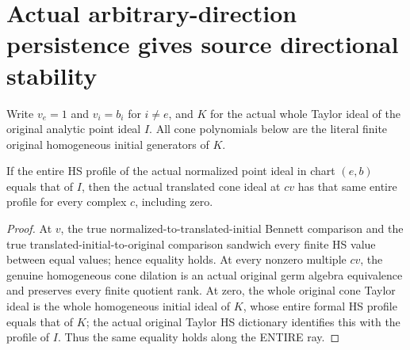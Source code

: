 \section{Actual arbitrary-direction persistence gives source directional stability}

Write $v_e=1$ and $v_i=b_i$ for $i\ne e$, and $K$ for the actual whole
Taylor ideal of the original analytic point ideal $I$. All cone polynomials
below are the literal finite original homogeneous initial generators of $K$.

\begin{theorem}
\label{hir:actual-directional-persistent-cone-ray-hs}
\leanok
If the entire HS profile of the actual normalized point ideal in chart
$(e,b)$ equals that of $I$, then the actual translated cone ideal at $cv$
has that same entire profile for every complex $c$, including zero.
\end{theorem}
\begin{proof}
At $v$, the true normalized-to-translated-initial Bennett comparison and
the true translated-initial-to-original comparison sandwich every finite
HS value between equal values; hence equality holds. At every nonzero
multiple $cv$, the genuine homogeneous cone dilation is an actual original
germ algebra equivalence and preserves every finite quotient rank.
At zero, the whole original cone Taylor ideal is the whole homogeneous
initial ideal of $K$, whose entire formal HS profile equals that of $K$;
the actual original Taylor HS dictionary identifies this with the profile
of $I$. Thus the same equality holds along the ENTIRE ray.
\end{proof}


